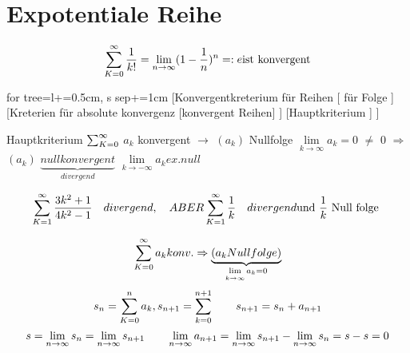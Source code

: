 \section{Expotentiale Reihe}

\[ \sum_{K=0}^{\infty} \frac{1}{k!} = \lim\limits_{n \rightarrow \infty} ( 1-\frac{1}{n})^n =:e \text{ist konvergent} \]

	\begin{forest}
	for tree={l+=0.5cm, s sep+=1cm}
	[Konvergentkreterium für Reihen 
	[	für Folge ]
	[Kreterien für absolute konvergenz [konvergent Reihen] ]
	[Hauptkriterium ]
	]
	\end{forest}

			Hauptkriterium $\sum_{K=0}^{\infty}$ $a_k$ konvergent $\rightarrow$ $(a_k)$ Nullfolge
			$\lim\limits_{k \rightarrow \infty} a_k=0$ $\neq$ $0$ $\Rightarrow$ $(a_k)$  	$\underbrace{null konvergent }_{divergend}$
			$\lim\limits_{k \rightarrow -\infty} a_k ex.null$

						\begin{example}
						
						\[ \sum_{K=1}^{\infty} \frac{3k^2+1}{4k^2-1} \quad divergend, \quad ABER \sum_{K=1}^{\infty} \frac{1}{k} \quad divergend \text{und $\frac{1}{k}$ Null folge }  \]
						

						\end{example}
\begin{example}
\[  \sum_{K=0}^{\infty} a_k konv. \Rightarrow \underbrace{(a_k Nullfolge) }_{\lim\limits_{k \rightarrow \infty} a_k=0}  \] 
\[s_n =\sum_{K=0}^{n} a_k , s_{n+1} =\sum_{k=0}^{n+1} \qquad s_{n+1}=s_n + a_{n+1} \]
\[s= \lim\limits_{n \rightarrow \infty} s_n= \lim\limits_{n \rightarrow \infty} s_{n+1} \qquad \lim\limits_{n \rightarrow \infty} a_{n+1} = \lim\limits_{n \rightarrow \infty} s_{n+1} - \lim\limits_{n \rightarrow \infty} s_n = s-s=0 \]
\end{example}
